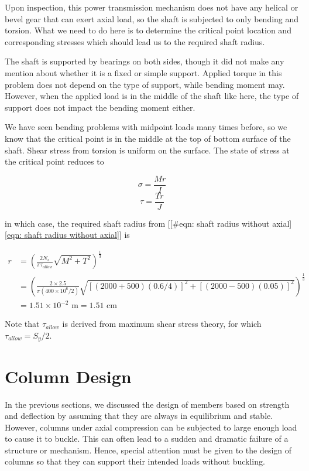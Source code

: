 \documentclass[a4paper,openany,12pt]{book}
\begin{document}
{{Upon inspection, this power transmission mechanism does not have any
helical or bevel gear that can exert axial load, so the shaft is
subjected to only bending and torsion. What we need to do here is to
determine the critical point location and corresponding stresses which
should lead us to the required shaft radius.

The shaft is supported by bearings on both sides, though it did not make
any mention about whether it is a fixed or simple support. Applied
torque in this problem does not depend on the type of support, while
bending moment may. However, when the applied load is in the middle of
the shaft like here, the type of support does not impact the bending
moment either.

We have seen bending problems with midpoint loads many times before, so
we know that the critical point is in the middle at the top of bottom
surface of the shaft. Shear stress from torsion is uniform on the
surface. The state of stress at the critical point reduces to

$$\sigma = \frac{Mr}{I}$$ $$\tau = \frac{Tr}{J}$$

in which case, the required shaft radius from
[[\#eqn: shaft radius without axial]\ref{eqn: shaft radius without axial}]
is

$$\begin{aligned}
    r &= \left( \frac{2 N_s}{\pi \tau _{allow}}\sqrt {M^2 +T^2}  \right)^{\frac{1}{3}} \\
      &= \left( \frac{2 \times 2.5}{\pi (400 \times 10^6 /2 )}\sqrt {[(2000+500)(0.6/4)]^2 +[(2000-500)(0.05)]^2}  \right)^{\frac{1}{3}} \\
      &= 1.51 \times 10^{-2} \text{ m} = 1.51 \text{ cm}
  \end{aligned}$$

Note that \(\tau_{allow}\) is derived from maximum shear stress theory,
for which \(\tau_{allow} = S_y/2\).

\section{Column Design}
\label{column-design}
In the previous sections, we discussed the design of members based on
strength and deflection by assuming that they are always in equilibrium
and stable. However, columns under axial compression can be subjected to
large enough load to cause it to buckle. This can often lead to a sudden
and dramatic failure of a structure or mechanism. Hence, special
attention must be given to the design of columns so that they can
support their intended loads without buckling.

}}
\end{document}

